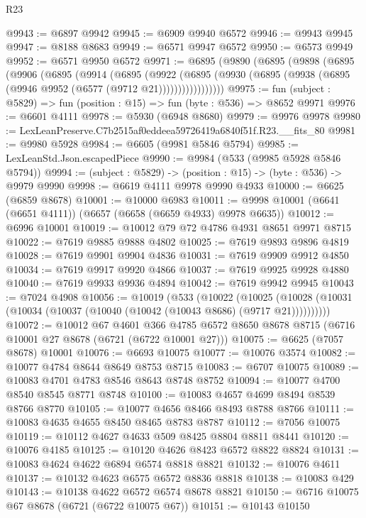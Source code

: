 \begin{lexlean}{R23}
\begin{coremodule}
@9943 := @6897 @9942
@9945 := @6909 @9940 @6572
@9946 := @9943 @9945
@9947 := @8188 @8683
@9949 := @6571 @9947 @6572
@9950 := @6573 @9949
@9952 := @6571 @9950 @6572
@9971 := @6895
    (@9890
      (@6895
        (@9898
          (@6895
            (@9906
              (@6895
                (@9914
                  (@6895
                    (@9922
                      (@6895
                        (@9930 (@6895 (@9938 (@6895 (@9946 @9952 (@6577 (@9712 @21)))))))))))))))))
@9975 := fun (subject : @5829) => fun (position : @15) => fun (byte : @536) => @8652 @9971
@9976 := @6601 @4111
@9978 := @5930 (@6948 @8680)
@9979 := @9976 @9978
@9980 := LexLeanPreserve.C7b2515af0eddeea59726419a6840f51f.R23.__fits_80
@9981 := @9980 @5928
@9984 := @6605 (@9981 @5846 @5794)
@9985 := LexLeanStd.Json.escapedPiece
@9990 := @9984 (@533 (@9985 @5928 @5846 @5794))
@9994 := (subject : @5829) -> (position : @15) -> (byte : @536) -> @9979 @9990
@9998 := @6619 @4111 @9978 @9990 @4933
@10000 := @6625 (@6859 @8678)
@10001 := @10000 @6983
@10011 := @9998 @10001 (@6641 (@6651 @4111)) (@6657 (@6658 (@6659 @4933) @9978 @6635))
@10012 := @6996 @10001
@10019 := @10012 @79 @72 @4786 @4931 @8651 @9971 @8715
@10022 := @7619 @9885 @9888 @4802
@10025 := @7619 @9893 @9896 @4819
@10028 := @7619 @9901 @9904 @4836
@10031 := @7619 @9909 @9912 @4850
@10034 := @7619 @9917 @9920 @4866
@10037 := @7619 @9925 @9928 @4880
@10040 := @7619 @9933 @9936 @4894
@10042 := @7619 @9942 @9945
@10043 := @7024 @4908
@10056 := @10019
    (@533
      (@10022
        (@10025 (@10028 (@10031 (@10034 (@10037 (@10040 (@10042 (@10043 @8686) (@9717 @21))))))))))
@10072 := @10012
    @67
    @4601
    @366
    @4785
    @6572
    @8650
    @8678
    @8715
    (@6716 @10001 @27 @8678 (@6721 (@6722 @10001 @27)))
@10075 := @6625 (@7057 @8678) @10001
@10076 := @6693 @10075
@10077 := @10076 @3574
@10082 := @10077 @4784 @8644 @8649 @8753 @8715
@10083 := @6707 @10075
@10089 := @10083 @4701 @4783 @8546 @8643 @8748 @8752
@10094 := @10077 @4700 @8540 @8545 @8771 @8748
@10100 := @10083 @4657 @4699 @8494 @8539 @8766 @8770
@10105 := @10077 @4656 @8466 @8493 @8788 @8766
@10111 := @10083 @4635 @4655 @8450 @8465 @8783 @8787
@10112 := @7056 @10075
@10119 := @10112 @4627 @4633 @509 @8425 @8804 @8811 @8441
@10120 := @10076 @4185
@10125 := @10120 @4626 @8423 @6572 @8822 @8824
@10131 := @10083 @4624 @4622 @6894 @6574 @8818 @8821
@10132 := @10076 @4611
@10137 := @10132 @4623 @6575 @6572 @8836 @8818
@10138 := @10083 @429
@10143 := @10138 @4622 @6572 @6574 @8678 @8821
@10150 := @6716 @10075 @67 @8678 (@6721 (@6722 @10075 @67))
@10151 := @10143 @10150

\end{coremodule}
\end{lexlean}
